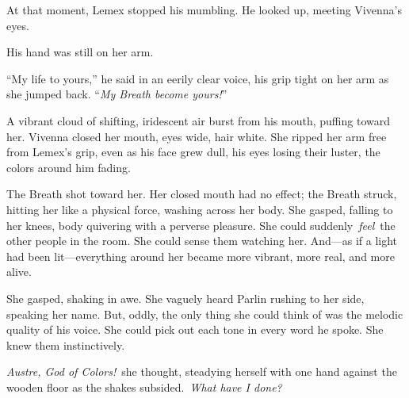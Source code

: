 At that moment, Lemex stopped his mumbling. He looked up, meeting Vivenna’s eyes.

His hand was still on her arm.

“My life to yours,” he said in an eerily clear voice, his grip tight on her arm as she jumped back. “\textit{My Breath become yours!}”

A vibrant cloud of shifting, iridescent air burst from his mouth, puffing toward her. Vivenna closed her mouth, eyes wide, hair white. She ripped her arm free from Lemex’s grip, even as his face grew dull, his eyes losing their luster, the colors around him fading.

The Breath shot toward her. Her closed mouth had no effect; the Breath struck, hitting her like a physical force, washing across her body. She gasped, falling to her knees, body quivering with a perverse pleasure. She could suddenly~\textit{feel}~the other people in the room. She could sense them watching her. And—as if a light had been lit—everything around her became more vibrant, more real, and more alive.

She gasped, shaking in awe. She vaguely heard Parlin rushing to her side, speaking her name. But, oddly, the only thing she could think of was the melodic quality of his voice. She could pick out each tone in every word he spoke. She knew them instinctively.

\textit{Austre, God of Colors!}~she thought, steadying herself with one hand against the wooden floor as the shakes subsided.~\textit{What have I done?}

